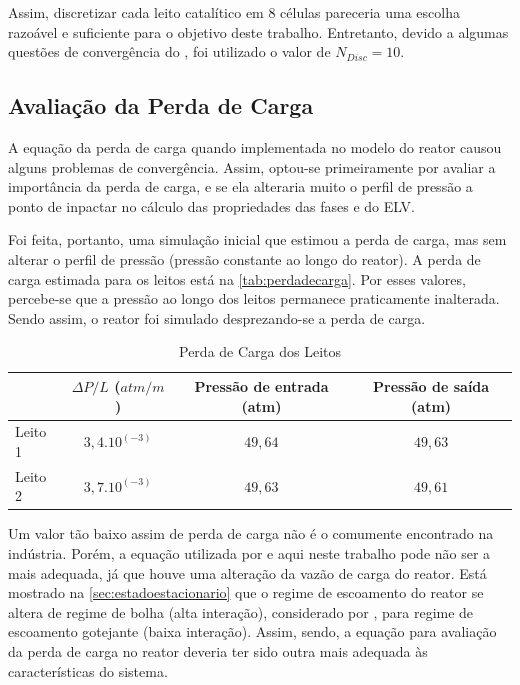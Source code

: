 Assim, discretizar cada leito catalítico em $8$ células pareceria uma escolha
razoável e suficiente para o objetivo deste trabalho. Entretanto, devido a
algumas questões de convergência do \emso, foi utilizado o valor de $N_{Disc} =
10$.

\subsection{Avaliação da Perda de Carga} \label{sec:avaliacaoperdadecarga}

A equação da perda de carga quando implementada no modelo do reator causou
alguns problemas de convergência. Assim, optou-se primeiramente por avaliar a
importância da perda de carga, e se ela alteraria muito o perfil de pressão a
ponto de inpactar no cálculo das propriedades das fases e do ELV.

Foi feita, portanto, uma simulação inicial que estimou a perda de carga, mas sem
alterar o perfil de pressão (pressão constante ao longo do reator). A perda de
carga estimada para os leitos está na \autoref{tab:perdadecarga}. Por esses
valores, percebe-se que a pressão ao longo dos leitos permanece praticamente
inalterada. Sendo assim, o reator foi simulado desprezando-se a perda de carga.

\begin{table}[!htb]
\begin{center}
\caption{Perda de Carga dos Leitos}
\label{tab:perdadecarga}
\small
\begin{tabular}{lccc}
{} & {$\Delta P/L$ ($atm/m$)} & {Pressão de entrada (atm)} & {Pressão de saída
(atm)}
\\
\hline
{Leito 1} & $3,4.10^{(-3)}$ & $49,64$ & $49,63$ \\
{Leito 2} & $3,7.10^{(-3)}$ & $49,63$ & $49,61$ \\
\bottomrule
\end{tabular}
\end{center}
\end{table}

Um valor tão baixo assim de perda de carga não é o comumente encontrado na
indústria. Porém, a equação utilizada por  e aqui neste
trabalho pode não ser a mais adequada, já que houve uma alteração da vazão de
carga do reator. Está mostrado na \autoref{sec:estadoestacionario} que o regime
de escoamento do reator se altera de regime de bolha (alta interação),
considerado por , para regime de escoamento gotejante
(baixa interação). Assim, sendo, a equação para avaliação da perda de carga no
reator deveria ter sido outra mais adequada às características do sistema.

